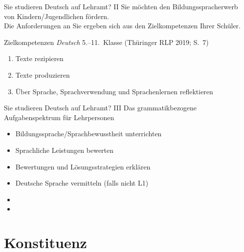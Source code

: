 \begin{frame}
  {Sie studieren Deutsch auf Lehramt? II}
  \onslide<+->
  \onslide<+->
  Sie möchten den \alert{Bildungsspracherwerb} von Kindern\slash Jugendlichen fördern.\\
  Die Anforderungen an Sie ergeben sich aus den \alert{Zielkompetenzen Ihrer Schüler}.\\
  \onslide<+->
  \Zeile
  \begin{block}
    {Zielkompetenzen \textit{Deutsch} 5.--11.~Klasse (Thüringer RLP 2019; S.~7)}
    \begin{enumerate}[<+->]
      \item Texte rezipieren
      \item Texte produzieren
      \item \alert{Über Sprache, Sprachverwendung und Sprachenlernen reflektieren}
    \end{enumerate}
  \end{block}
\end{frame}


\begin{frame}
  {Sie studieren Deutsch auf Lehramt? III}
  \onslide<+->
  \onslide<+->
  Das grammatikbezogene Aufgabenspektrum für Lehrpersonen\\
  \Zeile
  \begin{itemize}[<+->]
    \item \alert{Bildungssprache\slash Sprachbewusstheit} unterrichten
    \item Sprachliche Leistungen  bewerten
    \item Bewertungen und Lösungsstrategien \alert{erklären}
    \item \alert{Deutsche Sprache} vermitteln (falls nicht L1)
    \item {}
    \item {}
  \end{itemize}
\end{frame}




\section{Konstituenz}

